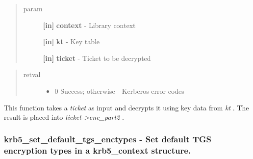 \documentclass[letterpaper,10pt,english]{sphinxmanual}
\begin{document}
\begin{fulllineitems}
\label{appdev/refs/api/krb5_server_decrypt_ticket_keytab:c.krb5_server_decrypt_ticket_keytab}
\end{fulllineitems}

\begin{quote}\begin{description}
\item[{param}] \leavevmode
\textbf{{[}in{]}} \textbf{context} - Library context

\textbf{{[}in{]}} \textbf{kt} - Key table

\textbf{{[}in{]}} \textbf{ticket} - Ticket to be decrypted

\end{description}\end{quote}
\begin{quote}\begin{description}
\item[{retval}] \leavevmode\begin{itemize}
\item {} 
0   Success; otherwise - Kerberos error codes

\end{itemize}

\end{description}\end{quote}

This function takes a \emph{ticket} as input and decrypts it using key data from \emph{kt} . The result is placed into \emph{ticket-\textgreater{}enc\_part2} .


\subsubsection{krb5\_set\_default\_tgs\_enctypes -  Set default TGS encryption types in a krb5\_context structure.}
\label{appdev/refs/api/krb5_set_default_tgs_enctypes::doc}\label{appdev/refs/api/krb5_set_default_tgs_enctypes:krb5-set-default-tgs-enctypes-set-default-tgs-encryption-types-in-a-krb5-context-structure}
\end{document}
